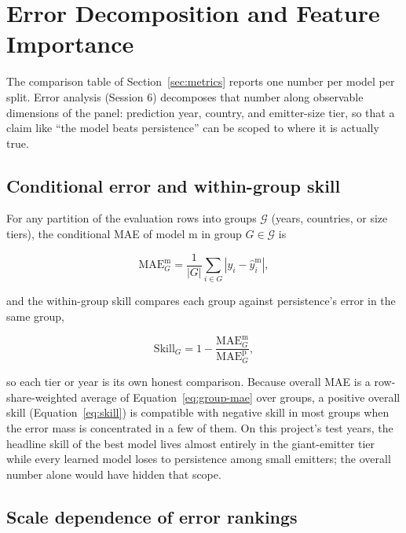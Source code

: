 \section{Error Decomposition and Feature Importance}
\label{sec:errordecomp}

The comparison table of Section~\ref{sec:metrics} reports one number per
model per split. Error analysis (Session 6) decomposes that number along
observable dimensions of the panel: prediction year, country, and
emitter-size tier, so that a claim like ``the model beats persistence''
can be scoped to where it is actually true.

\subsection{Conditional error and within-group skill}

For any partition of the evaluation rows into groups $\mathcal{G}$ (years,
countries, or size tiers), the conditional MAE of model $\mathrm{m}$ in
group $G \in \mathcal{G}$ is

\begin{equation}
\label{eq:group-mae}
\mathrm{MAE}^{\mathrm{m}}_{G} =
\frac{1}{|G|}\sum_{i \in G}\left| y_i - \hat y_i^{\mathrm{m}} \right|,
\end{equation}

and the within-group skill compares each group against persistence's error
in the same group,

\begin{equation}
\label{eq:group-skill}
\mathrm{Skill}_{G} = 1 -
\frac{\mathrm{MAE}^{\mathrm{m}}_{G}}{\mathrm{MAE}^{\mathrm{p}}_{G}},
\end{equation}

so each tier or year is its own honest comparison. Because overall MAE is a
row-share-weighted average of Equation~\ref{eq:group-mae} over groups, a
positive overall skill (Equation~\ref{eq:skill}) is compatible with negative
skill in most groups when the error mass is concentrated in a few of them.
On this project's test years, the headline skill of the best model lives
almost entirely in the giant-emitter tier while every learned model loses
to persistence among small emitters; the overall number alone would have
hidden that scope.

\subsection{Scale dependence of error rankings}

